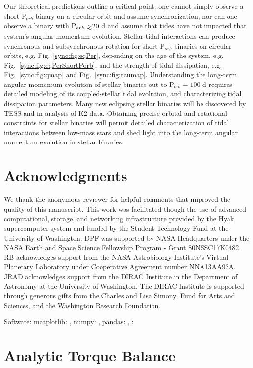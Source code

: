 Our theoretical predictions outline a critical point: one cannot simply observe a short P$_{orb}$ binary on a circular orbit and assume synchronization, nor can one observe a binary with P$_{orb} \gsim 20$ d and assume that tides have not impacted that system's angular momentum evolution.  Stellar-tidal interactions can produce synchronous and subsynchronous rotation for short P$_{orb}$ binaries on circular orbits, e.g. Fig.~\ref{sync:fig:eqPer}, depending on the age of the system, e.g. Fig.~\ref{sync:fig:eqPerShortPorb}, and the strength of tidal dissipation, e.g. Fig.~\ref{sync:fig:qmap} and Fig.~\ref{sync:fig:taumap}.  Understanding the long-term angular momentum evolution of stellar binaries out to P$_{orb} = 100$ d requires detailed modeling of its coupled-stellar tidal evolution, and characterizing tidal dissipation parameters. Many new eclipsing stellar binaries will be discovered by TESS \citep[e.g.][]{Sullivan2015,Matson2018} and in analysis of K2 data.  Obtaining precise orbital and rotational constraints for stellar binaries will permit detailed characterization of tidal interactions between low-mass stars and shed light into the long-term angular momentum evolution in stellar binaries. 

\section{Acknowledgments}
We thank the anonymous reviewer for helpful comments that improved the quality of this manuscript. This work was facilitated though the use of advanced computational, storage, and networking infrastructure provided by the Hyak supercomputer system and funded by the Student Technology Fund at the University of Washington. DPF was supported by NASA Headquarters under the NASA Earth and Space Science Fellowship Program - Grant 80NSSC17K0482.  RB acknowledges support from the NASA Astrobiology Institute's Virtual Planetary Laboratory under Cooperative Agreement number NNA13AA93A. JRAD acknowledges support from the DIRAC Institute in the Department of Astronomy at the University of Washington. The DIRAC Institute is supported through generous gifts from the Charles and Lisa Simonyi Fund for Arts and Sciences, and the Washington Research Foundation.

Software: matplotlib: \citet{Hunter2007}, numpy: \citet{vanderWalt2011}, pandas: \citet{Mckinney2010}, \vplanet: \citet{Barnes2019}

\section{Analytic Torque Balance} \label{sync:sec:appendix:balance}

